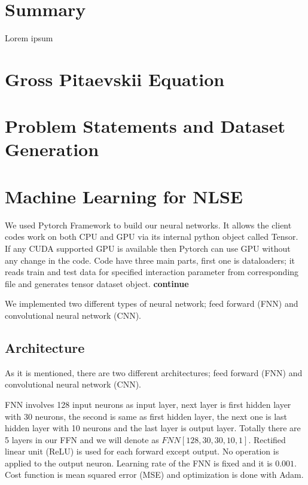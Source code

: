 \documentclass[a4paper,times,12pt]{article}
\title{}%
\date{}
\begin{document}
\setcounter{page}{1}

\section*{Summary}
Lorem ipsum

\section{Gross Pitaevskii Equation}
\section{Problem Statements and Dataset Generation}
\section{Machine Learning for NLSE}

We used Pytorch Framework to build our neural networks. It allows the client codes work on both CPU and GPU via its internal python object called Tensor. If any CUDA supported GPU is available then Pytorch can use GPU without any change in the code. Code have three main parts, first one is dataloaders; it reads train and test data for specified interaction parameter from corresponding file and generates tensor dataset object. \textbf{continue}


We implemented two different types of neural network; feed forward (FNN) and convolutional neural network (CNN). 


\subsection{Architecture}

As it is mentioned, there are two different architectures; feed forward (FNN) and convolutional neural network (CNN).  

FNN involves 128 input neurons as input layer, next layer is first hidden layer with 30 neurons, the second is same as first hidden layer, the next one is last hidden layer with 10 neurons and the last layer is output layer. Totally there are 5 layers in our FFN and we will denote as $FNN[128, 30, 30, 10, 1]$. Rectified linear unit (ReLU) is used for each forward except output. No operation is applied to the output neuron. Learning rate of the FNN is fixed and it is $0.001$. Cost function is mean squared error (MSE) and optimization is done with Adam. 
\end{document}
